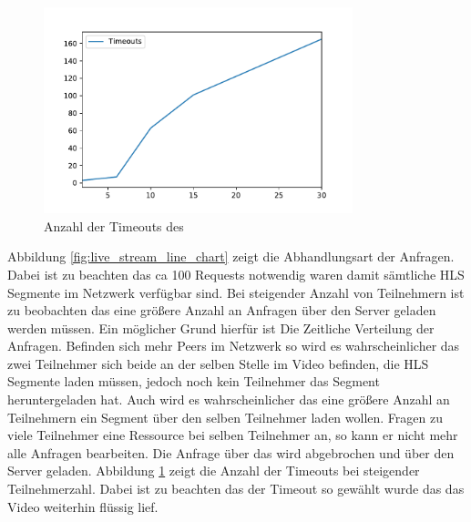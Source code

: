 \begin{figure}[!h]
	\centering
	\includegraphics[width=0.8\textwidth]{figures/timeouts}
	\caption[A Figure Short-Title]{Anzahl der Timeouts des \cdns}
	\label{fig:timeouts}
\end{figure}


Abbildung \ref{fig:live_stream_line_chart} zeigt die Abhandlungsart der Anfragen. Dabei ist zu beachten das ca 100 Requests notwendig waren damit sämtliche HLS Segmente im \pTp Netzwerk verfügbar sind. Bei steigender Anzahl von Teilnehmern ist zu beobachten das eine größere Anzahl an Anfragen über den Server geladen werden müssen. Ein möglicher Grund hierfür ist Die Zeitliche Verteilung der Anfragen. Befinden sich mehr Peers im Netzwerk so wird es wahrscheinlicher das zwei Teilnehmer sich beide an der selben Stelle im Video befinden, die HLS Segmente laden müssen, jedoch noch kein Teilnehmer das Segment heruntergeladen hat. Auch wird es wahrscheinlicher das eine größere Anzahl an Teilnehmern ein Segment über den selben Teilnehmer laden wollen. Fragen zu viele Teilnehmer eine Ressource bei selben Teilnehmer an, so kann er nicht mehr alle Anfragen bearbeiten. Die Anfrage über das \pTp \cdn wird abgebrochen und über den Server geladen. Abbildung \ref{fig:timeouts} zeigt die Anzahl der Timeouts bei steigender Teilnehmerzahl. Dabei ist zu beachten das der Timeout so gewählt wurde das das Video weiterhin flüssig lief.

